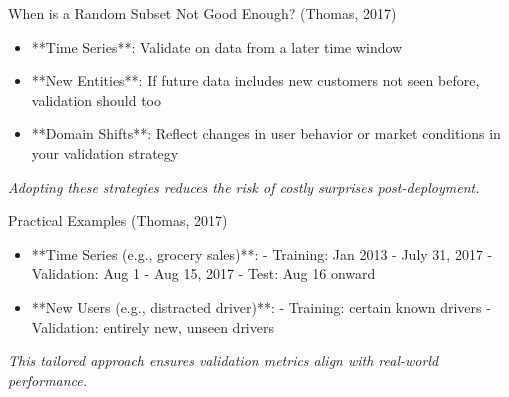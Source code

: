 \documentclass[aspectratio=169]{beamer}
\begin{document}
\begin{frame}{When is a Random Subset Not Good Enough? (Thomas, 2017)}
\begin{itemize}
\item **Time Series**: Validate on data from a later time window
\item **New Entities**: If future data includes new customers not seen before, validation should too
\item **Domain Shifts**: Reflect changes in user behavior or market conditions in your validation strategy
\end{itemize}

\emph{Adopting these strategies reduces the risk of costly surprises post-deployment.}
\end{frame}

%

\begin{frame}{Practical Examples (Thomas, 2017)}
\begin{itemize}
\item **Time Series (e.g., grocery sales)**:
  - Training: Jan 2013 - July 31, 2017
  - Validation: Aug 1 - Aug 15, 2017
  - Test: Aug 16 onward
\item **New Users (e.g., distracted driver)**:
  - Training: certain known drivers
  - Validation: entirely new, unseen drivers
\end{itemize}

\emph{This tailored approach ensures validation metrics align with real-world performance.}
\end{frame}
\end{document}

